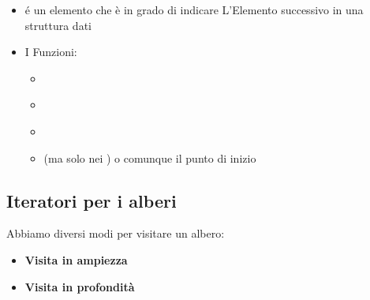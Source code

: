 \begin{itemize}
    \item é un elemento che è in grado di indicare L'Elemento successivo in una struttura dati
    \item I Funzioni:
    \begin{itemize}
        \item  \textbf{\textcolor{blue}{}}
        \item  \textbf{\textcolor{blue}{}}
        \item  \textbf{\textcolor{blue}{}}
        \item  \textbf{\textcolor{blue}{}} (ma solo nei ) o comunque il punto di inizio
    \end{itemize}
\end{itemize}

\subsection{Iteratori per i alberi}
Abbiamo diversi modi per visitare un albero:
\begin{itemize}
    \item \textbf{Visita in ampiezza}
    \item \textbf{Visita in profondità}
\end{itemize}
